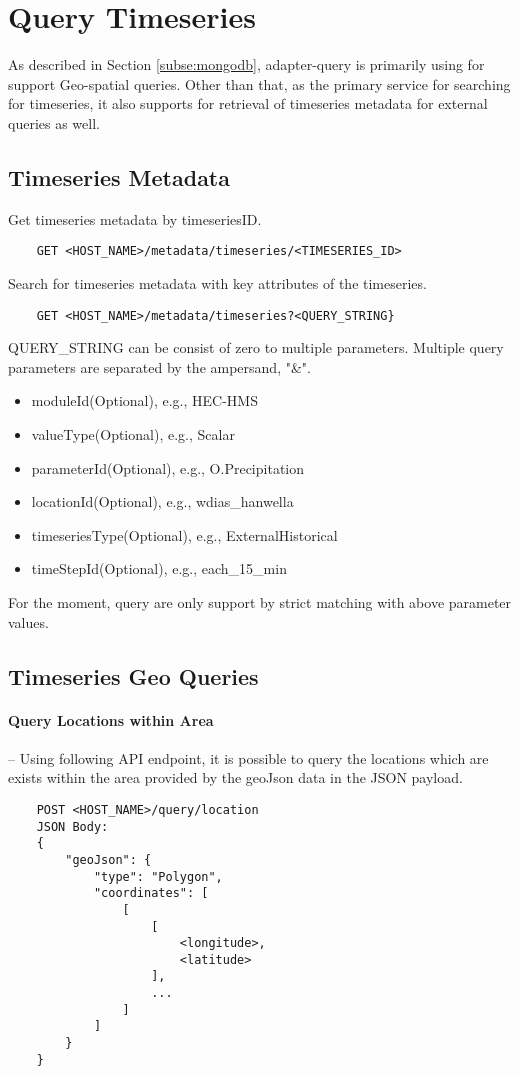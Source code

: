 \section{Query Timeseries}

As described in Section \ref{subse:mongodb}, adapter-query is primarily using for support Geo-spatial queries. Other than that, as the primary service for searching for timeseries, it also supports for retrieval of timeseries metadata for external queries as well.

\subsection{Timeseries Metadata}
Get timeseries metadata by timeseriesID.
\begin{lstlisting}
    GET <HOST_NAME>/metadata/timeseries/<TIMESERIES_ID>
\end{lstlisting}

Search for timeseries metadata with key attributes of the timeseries.
\begin{lstlisting}
    GET <HOST_NAME>/metadata/timeseries?<QUERY_STRING}
\end{lstlisting}

QUERY\_STRING can be consist of zero to multiple parameters. Multiple query parameters are separated by the ampersand, "\&".
\begin{itemize}
    \item moduleId(Optional), e.g., HEC-HMS
    \item valueType(Optional), e.g., Scalar
    \item parameterId(Optional), e.g., O.Precipitation
    \item locationId(Optional), e.g., wdias\_hanwella
    \item timeseriesType(Optional), e.g., ExternalHistorical
    \item timeStepId(Optional), e.g., each\_15\_min
\end{itemize}
For the moment, query are only support by strict matching with above parameter values.

\subsection{Timeseries Geo Queries}

\paragraph{Query Locations within Area}-- Using following API endpoint, it is possible to query the locations which are exists within the area provided by the geoJson data in the JSON payload.
\begin{lstlisting}
    POST <HOST_NAME>/query/location
    JSON Body:
    {
        "geoJson": {
            "type": "Polygon",
            "coordinates": [
                [
                    [
                        <longitude>,
                        <latitude>
                    ],
                    ...
                ]
            ]
        }
    }
\end{lstlisting}

